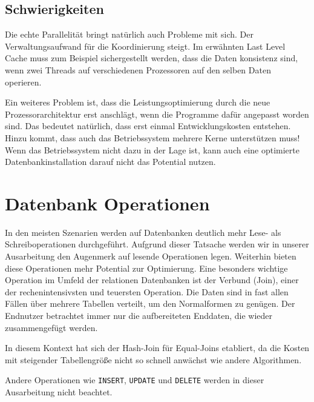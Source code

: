 \subsection*{Schwierigkeiten}
\label{sec:Multicore_Schwierigkeiten}
Die echte Parallelität bringt natürlich auch Probleme mit sich. Der Verwaltungsaufwand für die Koordinierung steigt. Im erwähnten Last Level Cache muss zum Beispiel sichergestellt werden, dass 
die Daten konsistenz sind, wenn zwei Threads auf verschiedenen Prozessoren auf den selben Daten operieren. 

Ein weiteres Problem ist, dass die Leistungsoptimierung durch die neue Prozessorarchitektur erst anschlägt, wenn die Programme dafür angepasst worden sind. Das bedeutet natürlich, dass erst einmal Entwicklungskosten entstehen. Hinzu kommt, dass auch das Betriebssystem mehrere Kerne unterstützen muss! Wenn das Betriebssystem nicht dazu in der Lage ist, kann auch eine optimierte Datenbankinstallation darauf nicht das Potential nutzen.

\section{Datenbank Operationen}
\label{sec:Operationen}
In den meisten Szenarien werden auf Datenbanken deutlich mehr Lese- als Schreiboperationen durchgeführt. Aufgrund dieser Tatsache werden wir in unserer Ausarbeitung den Augenmerk auf lesende Operationen legen. Weiterhin bieten diese Operationen mehr Potential zur Optimierung. Eine besonders wichtige Operation im Umfeld der relationen Datenbanken ist der Verbund (Join), einer der rechenintensivsten und teuersten Operation. Die Daten sind in fast allen Fällen über mehrere Tabellen verteilt, um den Normalformen zu genügen. Der Endnutzer betrachtet immer nur die aufbereiteten Enddaten, die wieder zusammengefügt werden.

In diesem Kontext hat sich der Hash-Join für Equal-Joins etabliert, da die Kosten mit steigender Tabellengröße nicht so schnell anwächst wie andere Algorithmen. 

Andere Operationen wie \texttt{INSERT}, \texttt{UPDATE} und \texttt{DELETE} werden in dieser Ausarbeitung nicht beachtet.
